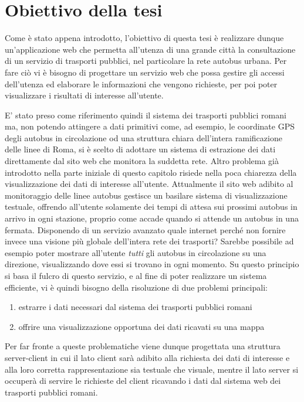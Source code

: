 \section{Obiettivo della tesi} %
\label{sec:section_name}

Come è stato appena introdotto, l'obiettivo di questa tesi è realizzare dunque un'applicazione web che permetta all'utenza di una grande città la consultazione di un servizio di trasporti pubblici, nel particolare la rete autobus urbana.
Per fare ciò vi è bisogno di progettare un servizio web che possa gestire gli accessi dell'utenza ed elaborare le informazioni che vengono richieste, per poi poter visualizzare i risultati di interesse all'utente.

E' stato preso come riferimento quindi il sistema dei trasporti pubblici romani ma, non potendo attingere a dati primitivi come, ad esempio, le coordinate GPS degli autobus in circolazione od una struttura chiara dell'intera ramificazione delle linee di Roma, si è scelto di adottare un sistema di estrazione dei dati direttamente dal sito web che monitora la suddetta rete.
Altro problema già introdotto nella parte iniziale di questo capitolo risiede nella poca chiarezza della visualizzazione dei dati di interesse all'utente. Attualmente il sito web adibito al monitoraggio delle linee autobus gestisce  un basilare sistema di visualizzazione testuale, offrendo all'utente solamente dei tempi di attesa sui prossimi autobus in arrivo in ogni stazione, proprio come accade quando si attende un autobus in una fermata.
Disponendo di un servizio avanzato quale internet perché non fornire invece una visione più globale dell'intera rete dei trasporti? Sarebbe possibile ad esempio poter mostrare all'utente {\itshape tutti} gli autobus in circolazione su una direzione, visualizzando dove essi si trovano in ogni momento.
Su questo principio si basa il fulcro di questo servizio, e al fine di poter realizzare un sistema efficiente, vi è quindi bisogno della risoluzione di due problemi principali:

\begin{enumerate}
    \item estrarre i dati necessari dal sistema dei trasporti pubblici romani
    \item offrire una visualizzazione opportuna dei dati ricavati su una mappa
\end{enumerate}

Per far fronte a queste problematiche viene dunque progettata una struttura server-client in cui il lato client sarà adibito alla richiesta dei dati di interesse e alla loro corretta rappresentazione sia testuale che visuale, mentre il lato server si occuperà di servire le richieste del client ricavando i dati dal sistema web dei trasporti pubblici romani.

